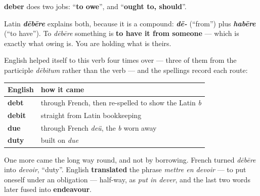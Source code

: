\begin{cousinweb}
\textbf{deber} does two jobs: \textquotedblleft{}\textbf{to owe}\textquotedblright{}, and \textquotedblleft{}\textbf{ought to, should}\textquotedblright{}.

Latin \emph{\textbf{dēbēre}} explains both, because it is a compound: \emph{\textbf{dē-}} (\textquotedblleft{}from\textquotedblright{}) plus \emph{\textbf{habēre}} (\textquotedblleft{}to have\textquotedblright{}). To \emph{dēbēre} something is \textbf{to have it from someone} — which is exactly what owing is. You are holding what is theirs.

English helped itself to this verb four times over — three of them from the participle \emph{dēbitum} rather than the verb — and the spellings record each route:

\noindent
\begin{tabularx}{\linewidth}{@{}>{\raggedright\arraybackslash}X>{\raggedright\arraybackslash}X@{}}
\toprule
\textbf{English} & \textbf{how it came} \\
\midrule
\textbf{debt} & through French, then re-spelled to show the Latin \emph{b} \\
\textbf{debit} & straight from Latin bookkeeping \\
\textbf{due} & through French \emph{deü}, the \emph{b} worn away \\
\textbf{duty} & built on \emph{due} \\
\bottomrule
\end{tabularx}

One more came the long way round, and not by borrowing. French turned \emph{dēbēre} into \emph{devoir}, \textquotedblleft{}duty\textquotedblright{}. English \textbf{translated} the phrase \emph{mettre en devoir} — to put oneself under an obligation — half-way, as \emph{put in dever}, and the last two words later fused into \textbf{endeavour}.
\end{cousinweb}

